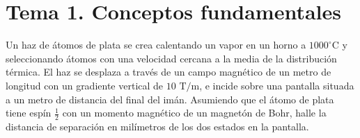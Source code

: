 \chapter*{Tema 1. Conceptos fundamentales}
\setcounter{chapter}{1}
\begin{enunciado}
Un haz de átomos de plata se crea calentando un vapor en un horno a $1000^\circ\text{C}$ y seleccionando átomos con una velocidad cercana a la media de la distribución térmica. El haz se desplaza a través de un campo magnético de un metro de longitud con un gradiente vertical de $10\text{ T/m}$, e incide sobre una pantalla situada a un metro de distancia del final del imán. Asumiendo que el átomo de plata tiene espín $\frac{1}{2}$ con un momento magnético de un magnetón de Bohr, halle la distancia de separación en milímetros de los dos estados en la pantalla.
\end{enunciado}

